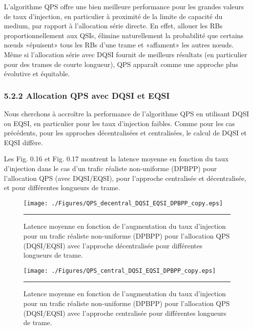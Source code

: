 L’algorithme QPS offre une bien meilleure performance pour les grandes valeurs de taux d'injection, en particulier à proximité de la limite de capacité du medium, par rapport à l'allocation série directe. En effet, allouer les RBs proportionnellement aux QSIs, élimine naturellement la probabilité que certains nœuds «épuisent» tous les RBs d’une trame et «affament» les autres nœuds. Même si l'allocation série avec DQSI fournit de meilleurs résultats (en particulier pour des trames de courte longueur), QPS apparaît comme une approche plus évolutive et équitable. 
 
\subsubsection*{5.2.2 Allocation QPS avec DQSI et EQSI}

Nous cherchons à accroître la performance de l'algorithme QPS en utilisant DQSI ou EQSI, en particulier pour les taux d'injection faibles. Comme pour les cas précédents, pour les approches décentralisées et centralisées, le calcul de DQSI et EQSI diffère.

Les Fig. 0.16 et Fig. 0.17 montrent la latence moyenne en fonction du taux d'injection dans le cas d’un trafic réaliste non-uniforme (DPBPP) pour l'allocation QPS (avec DQSI/EQSI), pour l'approche centralisée et décentralisée, et pour différentes longueurs de trame. 

 \begin{figure}[htbp]
  \centering
    \texttt{[image: ./Figures/QPS\_decentral\_DQSI\_EQSI\_DPBPP\_copy.eps]}
    \rule{35em}{0.5pt}
  \caption[Latence moyenne en fonction de l'augmentation du taux d'injection pour un trafic réaliste non-uniforme (DPBPP) pour l'allocation QPS (DQSI/EQSI) avec l'approche décentralisée pour différentes longueurs de trame.]{Latence moyenne en fonction de l'augmentation du taux d'injection pour un trafic réaliste non-uniforme (DPBPP) pour l'allocation QPS (DQSI/EQSI) avec l'approche décentralisée pour différentes longueurs de trame.}
  \label{fig:Electron}
\end{figure}

\begin{figure}[htbp]
  \centering
    \texttt{[image: ./Figures/QPS\_central\_DQSI\_EQSI\_DPBPP\_copy.eps]}
    \rule{35em}{0.5pt}
  \caption[Latence moyenne en fonction de l'augmentation du taux d'injection pour un trafic réaliste non-uniforme (DPBPP) pour l'allocation QPS (DQSI/EQSI) avec l'approche centralisée pour différentes longueurs de trame.]{Latence moyenne en fonction de l'augmentation du taux d'injection pour un trafic réaliste non-uniforme (DPBPP) pour l'allocation QPS (DQSI/EQSI) avec l'approche centralisée pour différentes longueurs de trame.}
  \label{fig:Electron}
\end{figure}

